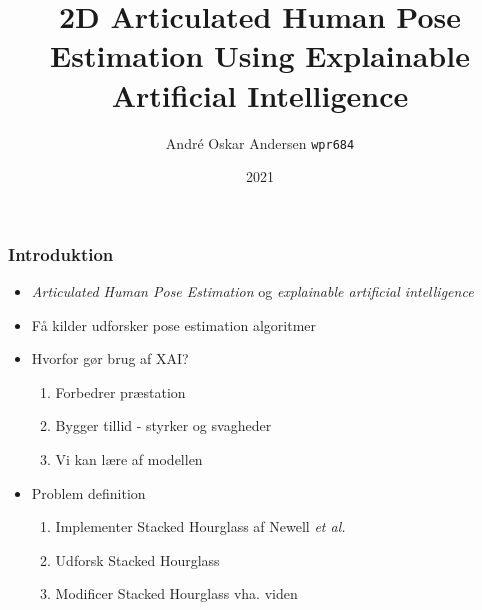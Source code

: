 \documentclass{beamer}
\begin{document}
\title{2D Articulated Human Pose Estimation
\newline \small Using Explainable Artificial Intelligence}

\author{André Oskar Andersen
\newline \small \texttt{wpr684}}


\date{2021}

\frame{\titlepage}

\begin{frame}
    \frametitle{Introduktion}
    \begin{minipage}{0.5\textwidth}
        \begin{itemize}
          \item<1-> \textit{Articulated Human Pose Estimation} og \textit{explainable artificial intelligence}
          \item <2-> Få kilder udforsker pose estimation algoritmer
        \end{itemize}
      \end{minipage} \hfill
      \begin{minipage}{0.45\textwidth}
        \begin{itemize}
            \item <3-> Hvorfor gør brug af XAI?
            \begin{enumerate}
                \item Forbedrer præstation
                \item Bygger tillid - styrker og svagheder
                \item Vi kan lære af modellen
            \end{enumerate}
            \item<4-> Problem definition
            \begin{enumerate}
                \item Implementer Stacked Hourglass af Newell \textit{et al.}
                \item Udforsk Stacked Hourglass
                \item Modificer Stacked Hourglass vha. viden
            \end{enumerate}
        \end{itemize}
      \end{minipage}
\end{frame}
\end{document}
